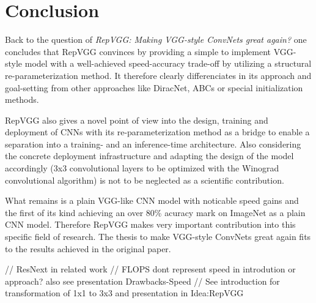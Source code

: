 \section{Conclusion}

Back to the question of \textit{RepVGG: Making VGG-style ConvNets great again?} one concludes that RepVGG convinces by providing a simple to implement VGG-style model with a well-achieved speed-accuracy trade-off by utilizing a structural re-parameterization method. It therefore clearly differenciates in its approach and goal-setting from other approaches like DiracNet, ABCs or special initialization methods. 

RepVGG also gives a novel point of view into the design, training and deployment of CNNs with its re-parameterization method as a bridge to enable a separation into a training- and an inference-time architecture. Also considering the concrete deployment infrastructure and adapting the design of the model accordingly (3x3 convolutional layers to be optimized with the Winograd convolutional algorithm) is not to be neglected as a scientific contribution. 

What remains is a plain VGG-like CNN model with noticable speed gains and the first of its kind achieving an over 80\% acuracy mark on ImageNet as a plain CNN model. Therefore RepVGG makes very important contribution into this specific field of research. The thesis to make VGG-style ConvNets great again fits to the results achieved in the original paper. 



// ResNext in related work
// FLOPS dont represent speed in introdution or approach? also see presentation Drawbacks-Speed
// See introduction for transformation of 1x1 to 3x3 and presentation in Idea:RepVGG